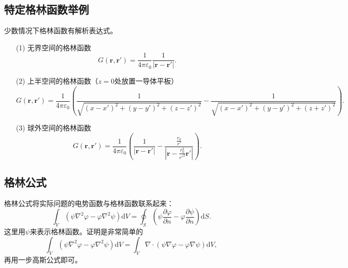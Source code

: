 \documentclass[UTF8]{ctexbook}
\renewcommand{\d}{\mathrm{d}}
\renewcommand{\b}{\boldsymbol}
\renewcommand{\k}{\frac{1}{4\pi\varepsilon_0}}
\numberwithin{equation}{chapter}
\begin{document}
	\subsection{特定格林函数举例}
	少数情况下格林函数有解析表达式。
	\begin{itemize}
		\item[(1)]无界空间的格林函数
		\[G(\b{r},\b{r}')=\k\frac{1}{|\b{r}-\b{r}'|}.\] 
		\item[(2)]上半空间的格林函数（$z=0$处放置一导体平板）
		\[G(\b{r},\b{r}')=\k\left(\frac{1}{\sqrt{(x-x')^2+(y-y')^2+(z-z')^2}}-\frac{1}{\sqrt{(x-x')^2+(y-y')^2+(z+z')^2}}\right).\]
		\item[(3)]球外空间的格林函数
		\[G(\b{r},\b{r}')=\k\left(\frac{1}{|\b{r}-\b{r}'|}-\frac{\frac{r_0}{r'}}{|\b{r}-\frac{r_0^2}{r'^2}\b{r}'|}\right).\]
		
		
	\end{itemize}
	\subsection{格林公式}
	格林公式将实际问题的电势函数与格林函数联系起来：
	\[\int_V(\psi\nabla^2\varphi-\varphi\nabla^2\psi)\d V=\oint_S\left(\psi\frac{\partial \varphi}{\partial n}-\varphi\frac{\partial \psi}{\partial n}\right)\d S.\]
	这里用$\psi$来表示格林函数。证明是非常简单的
	\[\int_V (\psi\nabla^2\varphi-\varphi\nabla^2\psi)\d V=\int_V \nabla\cdot(\psi\nabla\varphi-\varphi\nabla\psi)\d V,\]
	再用一步高斯公式即可。
	
\end{document}
